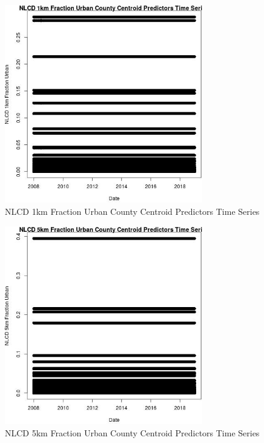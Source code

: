 \begin{figure} 
\centering  
\includegraphics[width=0.77\textwidth]{Code_Outputs/df_report_ML_predictors_CountyCentroid_Locations_Dates_2008-01-01to2018-12-31_NLCD_1km_Fraction_UrbanvDate.jpg} 
\caption{\label{fig:df_report_ML_predictors_CountyCentroid_Locations_Dates_2008-01-01to2018-12-31NLCD_1km_Fraction_UrbanvDate}NLCD 1km Fraction Urban County Centroid Predictors Time Series} 
\end{figure} 
 

\begin{figure} 
\centering  
\includegraphics[width=0.77\textwidth]{Code_Outputs/df_report_ML_predictors_CountyCentroid_Locations_Dates_2008-01-01to2018-12-31_NLCD_5km_Fraction_UrbanvDate.jpg} 
\caption{\label{fig:df_report_ML_predictors_CountyCentroid_Locations_Dates_2008-01-01to2018-12-31NLCD_5km_Fraction_UrbanvDate}NLCD 5km Fraction Urban County Centroid Predictors Time Series} 
\end{figure} 
 

